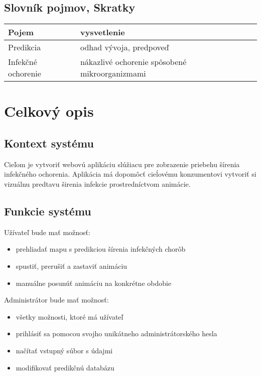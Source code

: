 \documentclass[12pt,a4paper]{report}
\begin{document}
\section[Slovník pojmov, Skratky]{\rmfamily\bfseries
	Slovník pojmov, Skratky}	
\begin{table}[h!]
	\centering
	\begin{tabular}{|>{\centering\arraybackslash}m{2in}|>{\centering\arraybackslash}m{1in}|}
		\hline
		\centering Pojem & vysvetlenie \\ [0ex]
		\hline
		Predikcia & odhad vývoja, predpoveď \\ [0ex]
		\hline
		Infekčné ochorenie & nákazlivé ochorenie spôsobené mikroorganizmami \\ [0ex]
		\hline
	\end{tabular}
\end{table}

\renewcommand{\chaptername}{}	
\chapter[Celkový opis]{\rmfamily\bfseries
	Celkový opis}

\section[Kontext systému]{\rmfamily\bfseries
	Kontext systému}
	Cieľom je vytvoriť webovú aplikáciu slúžiacu pre zobrazenie priebehu šírenia infekčného ochorenia. Aplikácia má dopomôcť cieĺovému konzumentovi vytvoriť si vizuálnu predtavu širenia infekcie prostredníctvom animácie.

\section[Funkcie systému]{\rmfamily\bfseries
	Funkcie systému}
Užívateľ bude mať možnosť:
\begin{itemize}
	\item prehliadať mapu s predikciou šírenia infekčných chorôb	
	\item spustiť, prerušiť a zastaviť animáciu
	\item manuálne posunúť animáciu na konkrétne obdobie
\end{itemize}
Administrátor bude mať možnosť:
\begin{itemize}
	\item všetky možnosti, ktoré má užívateľ 
	\item prihlásiť sa pomocou svojho unikátneho administrátorského hesla
	\item načítať vstupný súbor s údajmi
	\item modifikovať predikčnú databázu
\end{itemize}
\end{document}
